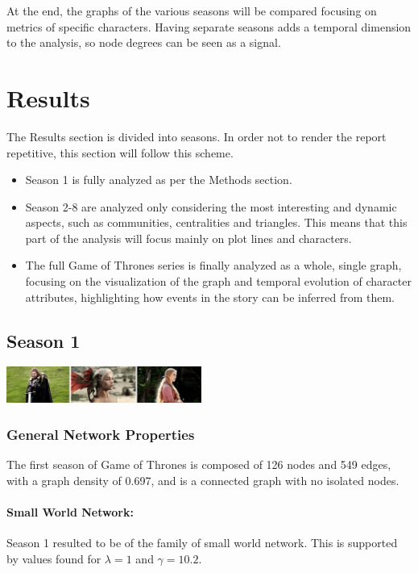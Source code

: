 \documentclass[10pt,twocolumn,letterpaper]{article}
\begin{document}
At the end, the graphs of the various seasons will be compared focusing on metrics of specific characters. Having separate seasons adds a temporal dimension to the analysis, so node degrees can be seen as a signal.

\section{Results}

The Results section is divided into seasons. In order not to render the report repetitive, this section will follow this scheme.

\begin{itemize}
    \item Season 1 is fully analyzed as per the Methods section.
    \item Season 2-8 are analyzed only considering the most interesting and dynamic aspects, such as communities, centralities and triangles. This means that this part of the analysis will focus mainly on plot lines and characters. 
    \item The full Game of Thrones series is finally analyzed as a whole, single graph, focusing on the visualization of the graph and temporal evolution of character attributes, highlighting how events in the story can be inferred from them.
\end{itemize}

\subsection{Season 1}

\begin{center}
    \includegraphics[width=0.48\textwidth]{img/s1/frames_s1.jpg}
\end{center}

\subsubsection{General Network Properties}

The first season of Game of Thrones is composed of 126 nodes and 549 edges, with a graph density of 0.697, and is a connected graph with no isolated nodes.

\paragraph{Small World Network:} Season 1 resulted to be of the family of small world network. This is supported by values found for $\lambda=1$ and $\gamma=10.2$.
\end{document}
